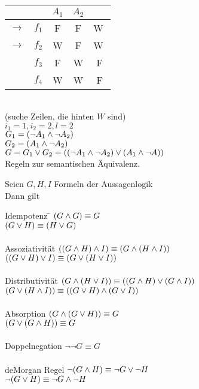 \beispiel{}\\
\begin{tabular}{cc|c|c|c}
 &  & $A_1$ & $A_2$ &   \\
\hline
$\rightarrow$ & $f_1$ & F & F & \textcircled{W}\\
$\rightarrow$ & $f_2$ & W & F & \textcircled{W}\\
 & $f_3$ & F & W & F\\
 & $f_4$ & W & W & F\\
\end{tabular}\\
(suche Zeilen, die hinten $W$ sind)\\

\noindent
$i_1 = 1, i_2 = 2, l=2$\\
$G_1 = (\neg A_1 \wedge \neg A_2)$\\
$G_2 = (A_1 \wedge \neg A_2)$\\
$G = G_1 \vee G_2 = (( \neg A_1 \wedge \neg A_2) \vee (A_1 \wedge \neg A))$\\

\vspace{1cm}
\noindent
Regeln zur semantischen Äquivalenz.

 Seien $G, H, I$ Formeln der Aussagenlogik\\
Dann gilt
\begin{tabbing}
Idempotenz \hspace{1cm} \= $(G \wedge G) \equiv G$\\
\> $(G \vee H) \equiv (H \vee G)$\\
\\
Assoziativität \> $((G \wedge H) \wedge I ) \equiv (G \wedge (H \wedge I))$\\
\> $((G \vee H) \vee I) \equiv (G \vee (H \vee I ))$\\
\\
Distributivität \> $(G \wedge ( H \vee I )) \equiv ((G \wedge H ) \vee (G \wedge I ))$\\
\> $(G \vee ( H \wedge I )) \equiv (( G \vee H ) \wedge ( G \vee I ))$\\
\\
Absorption \> $(G \wedge ( G \vee H )) \equiv G$\\
\> $(G \vee ( G \wedge H )) \equiv G$\\
\\
Doppelnegation \> $\neg \neg G \equiv G$\\
\\
deMorgan Regel \> $\neg ( G \wedge H ) \equiv \neg G \vee \neg H$\\
\> $\neg ( G \vee H) \equiv \neg G \wedge \neg H$
\end{tabbing}

